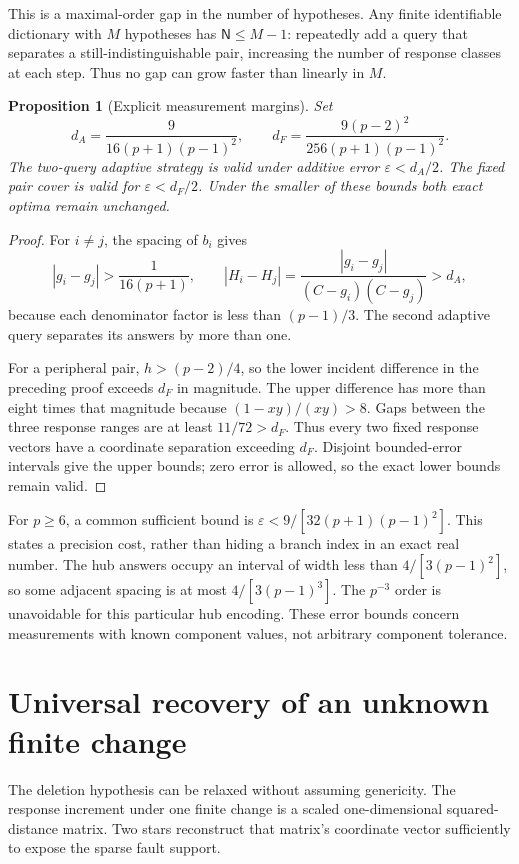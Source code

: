 \documentclass[11pt,letterpaper]{article}
\newtheorem{proposition}[theorem]{Proposition}
\newcommand{\N}{\mathsf N}
\begin{document}
This is a maximal-order gap in the number of hypotheses. Any finite identifiable dictionary with $M$ hypotheses has $\N\le M-1$: repeatedly add a query that separates a still-indistinguishable pair, increasing the number of response classes at each step. Thus no gap can grow faster than linearly in $M$.

\begin{proposition}[Explicit measurement margins]\label{prop:weightedprecision}
Set
\[
 d_A=\frac{9}{16(p+1)(p-1)^2},\qquad
 d_F=\frac{9(p-2)^2}{256(p+1)(p-1)^2}.
\]
The two-query adaptive strategy is valid under additive error $\varepsilon<d_A/2$. The fixed pair cover is valid for $\varepsilon<d_F/2$. Under the smaller of these bounds both exact optima remain unchanged.
\end{proposition}
\begin{proof}
For $i\ne j$, the spacing of $b_i$ gives
\[
 |g_i-g_j|>\frac1{16(p+1)},\qquad
 |H_i-H_j|=\frac{|g_i-g_j|}{(C-g_i)(C-g_j)}>d_A,
\]
because each denominator factor is less than $(p-1)/3$. The second adaptive query separates its answers by more than one.

For a peripheral pair, $h>(p-2)/4$, so the lower incident difference in the preceding proof exceeds $d_F$ in magnitude. The upper difference has more than eight times that magnitude because $(1-xy)/(xy)>8$. Gaps between the three response ranges are at least $11/72>d_F$. Thus every two fixed response vectors have a coordinate separation exceeding $d_F$. Disjoint bounded-error intervals give the upper bounds; zero error is allowed, so the exact lower bounds remain valid.
\end{proof}

For $p\ge6$, a common sufficient bound is $\varepsilon<9/[32(p+1)(p-1)^2]$. This states a precision cost, rather than hiding a branch index in an exact real number. The hub answers occupy an interval of width less than $4/[3(p-1)^2]$, so some adjacent spacing is at most $4/[3(p-1)^3]$. The $p^{-3}$ order is unavoidable for this particular hub encoding. These error bounds concern measurements with known component values, not arbitrary component tolerance.

\section{Universal recovery of an unknown finite change}\label{sec:universal}
The deletion hypothesis can be relaxed without assuming genericity. The response increment under one finite change is a scaled one-dimensional squared-distance matrix. Two stars reconstruct that matrix's coordinate vector sufficiently to expose the sparse fault support.
\end{document}
